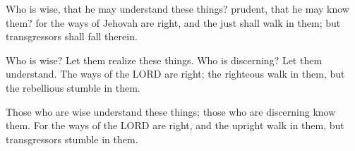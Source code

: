 			\begin{versebox}
					\item[BHS] 
					\item[LXX] 
					\item[ASV] Who is wise, that he may understand these things? prudent, that he may know them? for the ways of Jehovah are right, and the just shall walk in them; but transgressors shall fall therein.
					\item[NIV] Who is wise? Let them realize these things. Who is discerning? Let them understand. The ways of the LORD are right; the righteous walk in them, but the rebellious stumble in them.
					\item[NRSV] Those who are wise understand these things; those who are discerning know them. For the ways of the LORD are right, and the upright walk in them, but transgressors stumble in them.
			\end{versebox}
